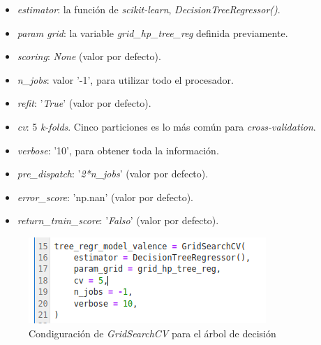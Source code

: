 \documentclass[12pt,a4paper,Spanish]{article}
\begin{document}
\begin{itemize}
	\item \textit{estimator}: la función de \textit{scikit-learn}, \textit{DecisionTreeRegressor()}.
	\item \textit{param grid}: la variable \textit{grid\_hp\_tree\_reg} definida previamente.
	\item \textit{scoring}: \textit{None} (valor por defecto).
	\item \textit{n\_jobs}: valor '-1', para utilizar todo el procesador.
	\item \textit{refit}: '\textit{True}' (valor por defecto).
	\item \textit{cv}: 5 \textit{k-folds}. Cinco particiones es lo más común para \textit{cross-validation}.
	\item \textit{verbose}: '10', para obtener toda la información.
	\item \textit{pre\_dispatch}: '\textit{2*n\_jobs}' (valor por defecto).
	\item \textit{error\_score}: 'np.nan' (valor por defecto).
	\item \textit{return\_train\_score}: '\textit{Falso}' (valor por defecto).
\end{itemize}
\begin{figure}[H]
	\centering
	\includegraphics[width=0.7\linewidth]{figs/cv_tree}
	\caption{Condiguración de \textit{GridSearchCV} para el árbol de decisión}
	\label{fig:cvtree}
\end{figure}
\end{document}
